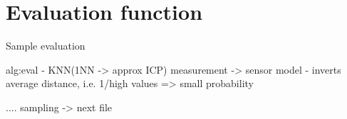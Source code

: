 \documentclass[Thesis.tex]{subfiles}
\begin{document}
\section{Evaluation function}
%
\begin{algorithm}[!htp]
\caption{Sample evaluation}
\label{alg:eval}

\end{algorithm}

alg:eval
- KNN(1NN -> approx ICP) measurement -> sensor model
- inverts average distance, i.e. 1/high values => small probability

.... sampling -> next file
\end{document}

